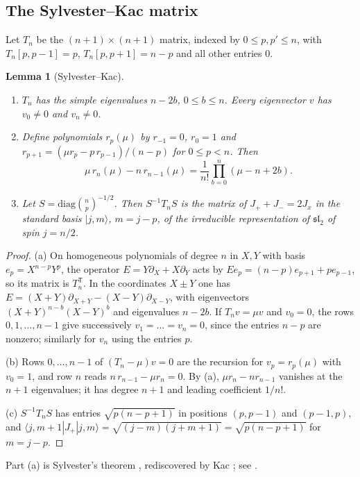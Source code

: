 \documentclass[11pt,a4paper]{article}
\newtheorem{lemma}[theorem]{Lemma}
\theoremstyle{definition}
\theoremstyle{remark}
\numberwithin{equation}{section}
\begin{document}
\subsection{The Sylvester--Kac matrix}
Let $T_n$ be the $(n+1)\times(n+1)$ matrix, indexed by $0\le p,p'\le n$, with $T_n[p,p-1]=p$, $T_n[p,p+1]=n-p$ and all other entries $0$.

\begin{lemma}[Sylvester--Kac]\label{V:lem:kac}
\begin{enumerate}
\item[(a)] $T_n$ has the simple eigenvalues $n-2b$, $0\le b\le n$. Every eigenvector $v$ has $v_0\ne0$ and $v_n\ne0$.
\item[(b)] Define polynomials $r_p(\mu)$ by $r_{-1}=0$, $r_0=1$ and $r_{p+1}=(\mu r_p-p\,r_{p-1})/(n-p)$ for $0\le p<n$. Then
\[
\mu\,r_n(\mu)-n\,r_{n-1}(\mu)=\frac1{n!}\prod_{b=0}^{n}(\mu-n+2b).
\]
\item[(c)] Let $S=\mathrm{diag}\binom np^{-1/2}$. Then $S^{-1}T_nS$ is the matrix of $J_++J_-=2J_x$ in the standard basis $|j,m\rangle$, $m=j-p$, of the irreducible representation of $\mathfrak{sl}_2$ of spin $j=n/2$.
\end{enumerate}
\end{lemma}

\begin{proof}
(a) On homogeneous polynomials of degree $n$ in $X,Y$ with basis $e_p=X^{n-p}Y^p$, the operator $E=Y\partial_X+X\partial_Y$ acts by $Ee_p=(n-p)e_{p+1}+pe_{p-1}$, so its matrix is $T_n^{\mathsf T}$. In the coordinates $X\pm Y$ one has $E=(X+Y)\partial_{X+Y}-(X-Y)\partial_{X-Y}$, with eigenvectors $(X+Y)^{n-b}(X-Y)^b$ and eigenvalues $n-2b$. If $T_nv=\mu v$ and $v_0=0$, the rows $0,1,\dots,n-1$ give successively $v_1=\dots=v_n=0$, since the entries $n-p$ are nonzero; similarly for $v_n$ using the entries $p$.

(b) Rows $0,\dots,n-1$ of $(T_n-\mu)v=0$ are the recursion for $v_p=r_p(\mu)$ with $v_0=1$, and row $n$ reads $n\,r_{n-1}-\mu r_n=0$. By (a), $\mu r_n-nr_{n-1}$ vanishes at the $n+1$ eigenvalues; it has degree $n+1$ and leading coefficient $1/n!$.

(c) $S^{-1}T_nS$ has entries $\sqrt{p(n-p+1)}$ in positions $(p,p-1)$ and $(p-1,p)$, and $\langle j,m+1|J_+|j,m\rangle=\sqrt{(j-m)(j+m+1)}=\sqrt{p(n-p+1)}$ for $m=j-p$.
\end{proof}

Part (a) is Sylvester's theorem \cite{Syl54}, rediscovered by Kac \cite{Kac47}; see \cite{TT91}.
\end{document}
